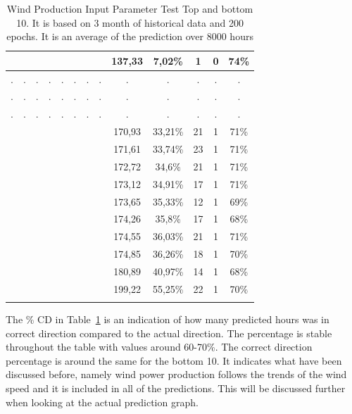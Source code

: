 \begin{center}
\begin{longtable}{|c|c|c|c|c|c|c|c|c|c|c|c|c|}
 \x &  &  &  &  &  \x &  &  & 137,33 & 7,02\% & 1 & 0 & 74\% \\ \hline
 . & . & . & . &  .  & . &  . & . & . & . & . & . & . \\ \hline
 . & . & . & . &  .  & . &  . & . & . & . & . & . & .\\ \hline
 . & . & . & . &  .  & . &  . & . & . & .& . & . & .\\ \hline
 \x &  \x &  &  \x &  &  \x &  \x &  & 170,93 & 33,21\% & 21 & 1 & 71\% \\ \hline
 \x &  &  \x &  \x &  \x &  \x &  \x &  \x & 171,61 & 33,74\% & 23 & 1 & 71\% \\ \hline
 \x &  &  \x &  \x &  &  \x &  \x &  & 172,72 & 34,6\% & 21 & 1 & 71\% \\ \hline
 \x &  &  &  &  \x &  \x &  \x &  & 173,12 & 34,91\% & 17 & 1 & 71\% \\ \hline
 \x &  &  \x &  \x &  &  \x &  \x &  \x & 173,65 & 35,33\% & 12 & 1 & 69\% \\ \hline
 \x &  \x &  \x &  \x &  \x &  \x &  \x &  \x & 174,26 & 35,8\% & 17 & 1 & 68\% \\ \hline
 \x &  \x &  &  \x &  &  \x &  \x &  \x & 174,55 & 36,03\% & 21 & 1 & 71\% \\ \hline
 \x &  &  &  \x &  &  \x &  \x &  \x & 174,85 & 36,26\% & 18 & 1 & 70\% \\ \hline
 \x &  \x &  \x &  &  \x &  \x &  \x &  & 180,89 & 40,97\% & 14 & 1 & 68\% \\ \hline
 \x &  \x &  &  &  \x &  \x &  \x &  \x & 199,22 & 55,25\% & 22 & 1 & 70\% \\ \hline
\caption{Wind Production Input Parameter Test Top and bottom 10. It is based on 3 month of historical data and 200 epochs. It is an average of the prediction over 8000 hours}
\label{table:windProdInputParamsTop10}
\end{longtable}
\end{center}
\normalsize

\noindent The \% CD in Table~\ref{table:windProdInputParamsTop10} is an indication of how many predicted hours was in correct direction compared to the actual direction. The percentage is stable throughout the table with values around 60-70\%. The correct direction percentage is around the same for the bottom 10. It indicates what have been discussed before, namely wind power production follows the trends of the wind speed and it is included in all of the predictions. This will be discussed further when looking at the actual prediction graph.

